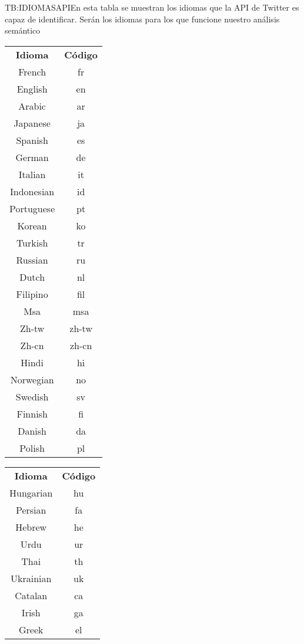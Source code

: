 \begin{table}[Idiomas soportados por la API de Twitter]{TB:IDIOMASAPI}{En esta tabla se muestran los idiomas que la API de Twitter es capaz de identificar. Serán los idiomas para los que funcione nuestro análisis semántico}
	
	{
		\begin{tabular}{|c|c|}
		\hline
		\textbf{Idioma} & \textbf{Código} \\
		French & fr\\ 
		English & en\\ 
		Arabic & ar\\ 
		Japanese & ja\\ 
		Spanish & es\\ 
		German & de\\ 
		Italian & it\\ 
		Indonesian & id\\ 
		Portuguese & pt\\ 
		Korean & ko\\ 
		Turkish & tr\\ 
		Russian & ru\\ 
		Dutch & nl\\ 
		Filipino & fil\\ 
		Msa & msa\\ 
		Zh-tw & zh-tw\\ 
		Zh-cn & zh-cn\\ 
		Hindi & hi\\ 
		Norwegian & no\\ 
		Swedish & sv\\ 
		Finnish & fi\\ 
		Danish & da\\ 
		Polish & pl\\ 
		\hline \hline
		\hline
		\end{tabular}
	}
	{
		\begin{tabular}{|c|c|}
		\hline
		\textbf{Idioma} & \textbf{Código} \\
		Hungarian & hu\\ 
		Persian & fa\\ 
		Hebrew & he\\ 
		Urdu & ur\\ 
		Thai & th\\ 
		Ukrainian & uk\\ 
		Catalan & ca\\ 
		Irish & ga\\ 
		Greek & el\\ 

\end{tabular}}
\end{table}
